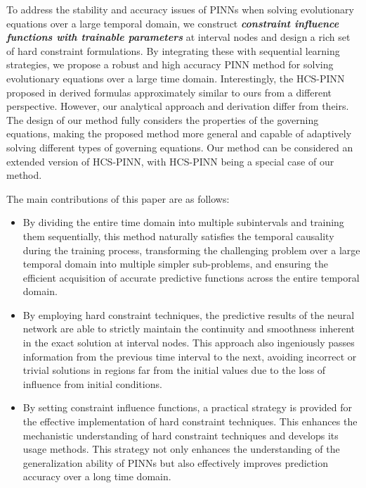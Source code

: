 \documentclass[preprint]{elsarticle}
\numberwithin{table}{section}
\numberwithin{equation}{section}
\numberwithin{figure}{section}
\begin{document}
\begin{CJK}{UTF8}{gbsn}
  

To address the stability and accuracy issues  of PINNs when solving evolutionary equations over a large temporal  domain, we construct \textbf{\textit{constraint influence functions with trainable parameters}} at interval nodes and design a rich set of hard constraint formulations.  By integrating these with sequential learning strategies, we propose a robust   and high accuracy PINN method  for solving evolutionary equations over a large time domain. Interestingly, the HCS-PINN proposed in \cite{Exact} derived formulas approximately similar to ours from a different perspective.
However, our analytical approach and derivation  differ from theirs. The design of our method fully considers the properties of the governing equations, making the proposed method more general and capable of adaptively solving different types of governing equations.  Our method can be considered an extended version of HCS-PINN, with HCS-PINN being a special case of our method.

 
The main contributions of this paper are as follows: 
\begin{itemize}
 \item 
By dividing the entire time domain into multiple subintervals and training them sequentially, this method naturally satisfies the temporal causality during the training process, transforming the challenging problem over a large temporal domain  into multiple simpler sub-problems, and ensuring the efficient acquisition of accurate predictive functions across the entire temporal  domain.

 

 \item By employing hard constraint techniques, the  predictive results of the neural network are able to strictly maintain the continuity and smoothness  inherent in the exact solution at interval nodes. This approach also  {ingeniously passes information} from the previous time interval to the next, avoiding incorrect or trivial solutions in regions far from the initial values due to the loss of influence from initial conditions.


 


 
 \item  
By setting constraint influence functions, a practical strategy is provided for the effective implementation of hard constraint techniques. This enhances the mechanistic understanding of hard constraint techniques and develops its usage methods. This strategy not only enhances the understanding of the generalization ability of PINNs but also effectively improves prediction accuracy over a long time domain.



\end{itemize}
\end{CJK}
\end{document}

